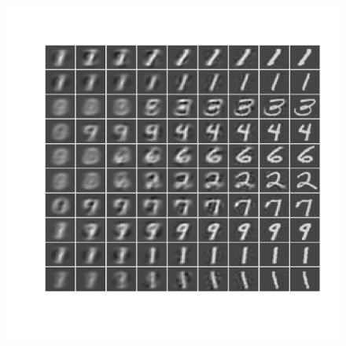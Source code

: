 \documentclass{article}
\begin{document}
\begin{figure}\centering
	\includegraphics[scale=\sscale]{digitreduce}
	\caption{}\label{fig:reduce}
\end{figure}
\end{document}
